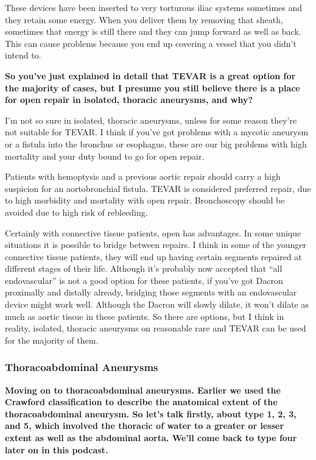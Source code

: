 \documentclass[
]{book}
\begin{document}
These devices have been inserted to very torturous iliac systems
sometimes and they retain some energy. When you deliver them by removing
that sheath, sometimes that energy is still there and they can jump
forward as well as back. This can cause problems because you end up
covering a vessel that you didn't intend to.

\textbf{So you've just explained in detail that TEVAR is a great option for
the majority of cases, but I presume you still believe there is a place
for open repair in isolated, thoracic aneurysms, and why?}

I'm not so sure in isolated, thoracic aneurysms, unless for some reason
they're not suitable for TEVAR. I think if you've got problems with a
mycotic aneurysm or a fistula into the bronchus or esophagus, these are
our big problems with high mortality and your duty bound to go for open
repair.

Patients with hemoptysis and a previous aortic repair should carry a
high suspicion for an aortobronchial fistula. TEVAR is considered
preferred repair, due to high morbidity and mortality with open repair.
Bronchoscopy should be avoided due to high risk of
rebleeding.\citep{bailey2011, léobon2002, quintana2006}

Certainly with connective tissue patients, open has advantages. In some
unique situations it is possible to bridge between repairs. I think in
some of the younger connective tissue patients, they will end up having
certain segments repaired at different stages of their life. Although
it's probably now accepted that ``all endovascular'' is not a good option
for these patients, if you've got Dacron proximally and distally
already, bridging those segments with an endovascular device might work
well. Although the Dacron will slowly dilate, it won't dilate as much as
aortic tissue in these patients. So there are options, but I think in
reality, isolated, thoracic aneurysms on reasonable rare and TEVAR can
be used for the majority of them.

\hypertarget{thoracoabdominal-aneurysms}{%
\subsubsection{Thoracoabdominal Aneurysms}\label{thoracoabdominal-aneurysms}}

\textbf{Moving on to thoracoabdominal aneurysms. Earlier we used the Crawford
classification to describe the anatomical extent of the thoracoabdominal
aneurysm. So let's talk firstly, about type 1, 2, 3, and 5, which
involved the thoracic of water to a greater or lesser extent as well as
the abdominal aorta. We'll come back to type four later on in this
podcast.}
\end{document}
